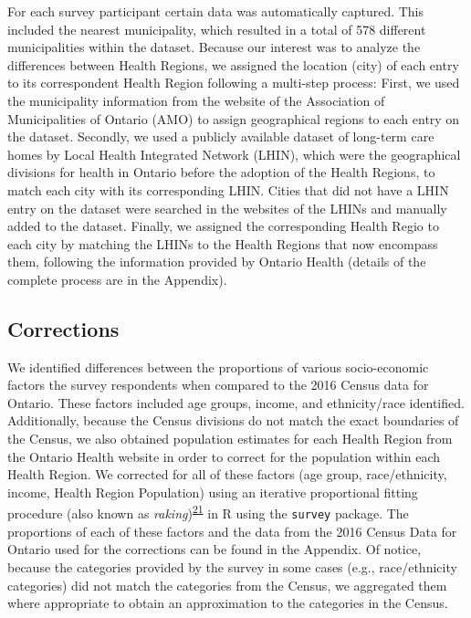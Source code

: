 \documentclass[
  letterpaper,
  DIV=11,
  numbers=noendperiod]{scrartcl}
\begin{document}
For each survey participant certain data was automatically captured.
This included the nearest municipality, which resulted in a total of 578
different municipalities within the dataset. Because our interest was to
analyze the differences between Health Regions, we assigned the location
(city) of each entry to its correspondent Health Region following a
multi-step process: First, we used the municipality information from the
website of the Association of Municipalities of Ontario (AMO) to assign
geographical regions to each entry on the dataset. Secondly, we used a
publicly available dataset of long-term care homes by Local Health
Integrated Network (LHIN), which were the geographical divisions for
health in Ontario before the adoption of the Health Regions, to match
each city with its corresponding LHIN. Cities that did not have a LHIN
entry on the dataset were searched in the websites of the LHINs and
manually added to the dataset. Finally, we assigned the corresponding
Health Regio to each city by matching the LHINs to the Health Regions
that now encompass them, following the information provided by Ontario
Health (details of the complete process are in the Appendix).

\hypertarget{corrections}{%
\subsection{Corrections}\label{corrections}}

We identified differences between the proportions of various
socio-economic factors the survey respondents when compared to the 2016
Census data for Ontario. These factors included age groups, income, and
ethnicity/race identified. Additionally, because the Census divisions do
not match the exact boundaries of the Census, we also obtained
population estimates for each Health Region from the Ontario Health
website in order to correct for the population within each Health
Region. We corrected for all of these factors (age group,
race/ethnicity, income, Health Region Population) using an iterative
proportional fitting procedure (also known as
\emph{raking})\textsuperscript{\protect\hyperlink{ref-deming1940}{21}}
in R using the \texttt{survey} package. The proportions of each of these
factors and the data from the 2016 Census Data for Ontario used for the
corrections can be found in the Appendix. Of notice, because the
categories provided by the survey in some cases (e.g., race/ethnicity
categories) did not match the categories from the Census, we aggregated
them where appropriate to obtain an approximation to the categories in
the Census.
\end{document}
